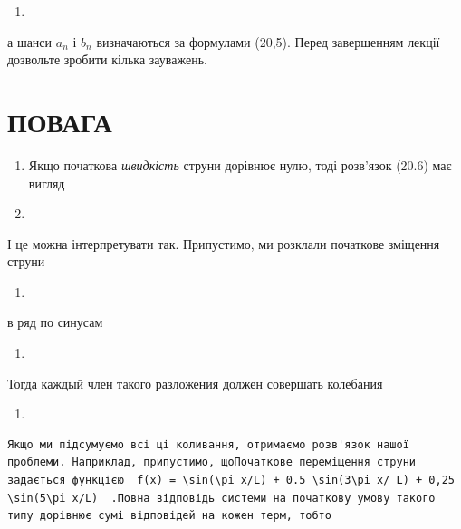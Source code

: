 \documentclass[
  ukrainian,
]{article}
\providecommand{\tightlist}{%
  \setlength{\itemsep}{0pt}\setlength{\parskip}{0pt}}
\begin{document}
\begin{enumerate}
\def\labelenumi{\arabic{enumi}.}
\setcounter{enumi}{12}
\tightlist
\item
\end{enumerate}

а шанси \(a_n\) і \(b_n\) визначаються за формулами (20,5). Перед
завершенням лекції дозвольте зробити кілька зауважень.

\section{ПОВАГА}\label{ux43fux43eux432ux430ux433ux430}

\begin{enumerate}
\def\labelenumi{\arabic{enumi}.}
\item
  Якщо початкова \emph{швидкість} струни дорівнює нулю, тоді розв'язок
  (20.6) має вигляд
\item
\end{enumerate}

І це можна інтерпретувати так. Припустимо, ми розклали початкове
зміщення струни

\begin{enumerate}
\def\labelenumi{\arabic{enumi}.}
\setcounter{enumi}{14}
\tightlist
\item
\end{enumerate}

в ряд по синусам

\begin{enumerate}
\def\labelenumi{\arabic{enumi}.}
\setcounter{enumi}{15}
\tightlist
\item
\end{enumerate}

Тогда каждый член такого разложения должен совершать колебания

\begin{enumerate}
\def\labelenumi{\arabic{enumi}.}
\setcounter{enumi}{16}
\tightlist
\item
\end{enumerate}

\begin{verbatim}
Якщо ми підсумуємо всі ці коливання, отримаємо розв'язок нашої проблеми. Наприклад, припустимо, щоПочаткове переміщення струни задається функцією  f(x) = \sin(\pi x/L) + 0.5 \sin(3\pi x/ L) + 0,25 \sin(5\pi x/L)  .Повна відповідь системи на початкову умову такого типу дорівнює сумі відповідей на кожен терм, тобто
\end{verbatim}
\end{document}
